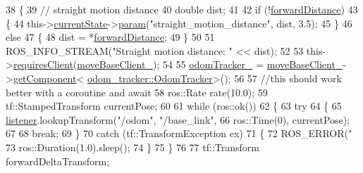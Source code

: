 \begin{DoxyCode}
38     \{
39         \textcolor{comment}{// straight motion distance}
40         \textcolor{keywordtype}{double} dist;
41 
42         \textcolor{keywordflow}{if} (!\hyperlink{classsm__dance__bot_1_1move__base__z__client_1_1CbNavigateForward_a2c1a04f86c3a0c40d516654fa0b4944a}{forwardDistance})
43         \{
44             this->\hyperlink{classsmacc_1_1SmaccClientBehavior_af76fc9b877542ed5caf033f820c107d0}{currentState}->\hyperlink{classsmacc_1_1ISmaccState_a4982f2187ed6da337462721146e8ef70}{param}(\textcolor{stringliteral}{"straight\_motion\_distance"}, dist, 3.5);
45         \}
46         \textcolor{keywordflow}{else}
47         \{
48             dist = *\hyperlink{classsm__dance__bot_1_1move__base__z__client_1_1CbNavigateForward_a2c1a04f86c3a0c40d516654fa0b4944a}{forwardDistance};
49         \}
50 
51         ROS\_INFO\_STREAM(\textcolor{stringliteral}{"Straight motion distance: "} << dist);
52 
53         this->\hyperlink{classsmacc_1_1SmaccClientBehavior_a917f001e763a1059af337bf4e164f542}{requiresClient}(\hyperlink{classsm__dance__bot_1_1move__base__z__client_1_1CbNavigateForward_a717bce9f5100540c48e413725e476408}{moveBaseClient\_});
54 
55         \hyperlink{classsm__dance__bot_1_1move__base__z__client_1_1CbNavigateForward_affc6ced1bd3ba8cb80461a1a60c65d04}{odomTracker\_} = \hyperlink{classsm__dance__bot_1_1move__base__z__client_1_1CbNavigateForward_a717bce9f5100540c48e413725e476408}{moveBaseClient\_}->\hyperlink{classsmacc_1_1ISmaccClient_adef78db601749ca63c19e74a27cb88cc}{getComponent}<
      \hyperlink{classodom__tracker_1_1OdomTracker}{odom\_tracker::OdomTracker}>();
56 
57         \textcolor{comment}{//this should work better with a coroutine and await}
58         ros::Rate rate(10.0);
59         tf::StampedTransform currentPose;
60 
61         \textcolor{keywordflow}{while} (ros::ok())
62         \{
63             \textcolor{keywordflow}{try}
64             \{
65                 \hyperlink{classsm__dance__bot_1_1move__base__z__client_1_1CbNavigateForward_ada990a8520ff4e8e4051e7043958c636}{listener}.lookupTransform(\textcolor{stringliteral}{"/odom"}, \textcolor{stringliteral}{"/base\_link"},
66                                          ros::Time(0), currentPose);
67 
68                 \textcolor{keywordflow}{break};
69             \}
70             \textcolor{keywordflow}{catch} (tf::TransformException ex)
71             \{
72                 ROS\_ERROR(\textcolor{stringliteral}{"%
73                 ros::Duration(1.0).sleep();
74             \}
75         \}
76 
77         tf::Transform forwardDeltaTransform;
}
\end{DoxyCode}
